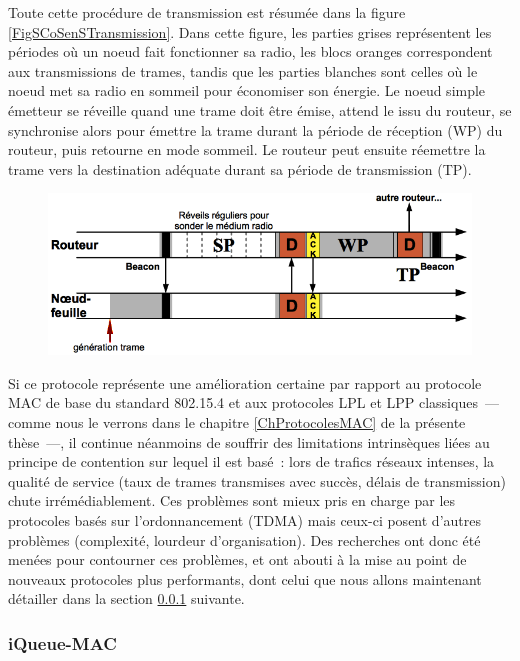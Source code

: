 Toute cette procédure de transmission est résumée dans la figure
\vref{FigSCoSenSTransmission}. Dans cette figure, les parties grises
représentent les périodes où un noeud fait fonctionner sa radio,
les blocs oranges correspondent aux transmissions de trames, tandis que
les parties blanches sont celles où le noeud met sa radio en sommeil pour
économiser son énergie. Le noeud simple émetteur se réveille quand une
trame doit être émise, attend le  issu du routeur,
se synchronise alors pour émettre la trame durant la période de réception
(WP) du routeur, puis retourne en mode sommeil. Le routeur peut ensuite
réemettre la trame vers la destination adéquate durant sa période
de transmission (TP).

\begin{figure}[!hbt]
\centering
\includegraphics[width=11.5cm]{images/ch3-s-cosens-transmission.png}
\label{FigSCoSenSTransmission}
\end{figure}

\bigskip

Si ce protocole représente une amélioration certaine par rapport
au protocole MAC de base du standard 802.15.4 et aux protocoles
LPL et LPP classiques~--- comme nous le verrons dans le chapitre
\ref{ChProtocolesMAC} de la présente thèse~---, il continue néanmoins
de souffrir des limitations intrinsèques liées au principe de contention
sur lequel il est basé~: lors de trafics réseaux intenses, la qualité
de service (taux de trames transmises avec succès, délais de
transmission) chute irrémédiablement. Ces problèmes sont mieux
pris en charge par les protocoles basés sur l'ordonnancement
(TDMA) mais ceux-ci posent d'autres problèmes (complexité,
lourdeur d'organisation). Des recherches ont donc été menées
pour contourner ces problèmes, et ont abouti à la mise au
point de nouveaux protocoles plus performants, dont celui
que nous allons maintenant détailler dans la section
\ref{PariQueueMAC} suivante.

\subsubsection{iQueue-MAC}
\label{PariQueueMAC}

